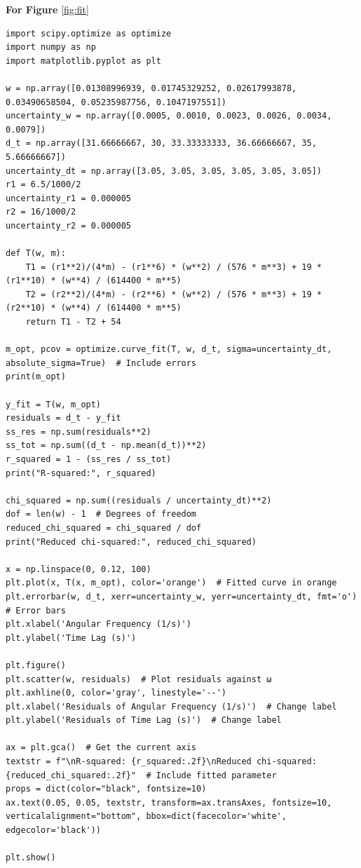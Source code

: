 \documentclass[12pt]{article}
\begin{document}
\newpage
\textbf{For Figure }\ref{fig:fit}
\begin{lstlisting}
import scipy.optimize as optimize
import numpy as np
import matplotlib.pyplot as plt

w = np.array([0.01308996939, 0.01745329252, 0.02617993878, 0.03490658504, 0.05235987756, 0.1047197551])
uncertainty_w = np.array([0.0005, 0.0010, 0.0023, 0.0026, 0.0034, 0.0079])
d_t = np.array([31.66666667, 30, 33.33333333, 36.66666667, 35, 5.66666667])
uncertainty_dt = np.array([3.05, 3.05, 3.05, 3.05, 3.05, 3.05])
r1 = 6.5/1000/2
uncertainty_r1 = 0.000005
r2 = 16/1000/2
uncertainty_r2 = 0.000005

def T(w, m):
    T1 = (r1**2)/(4*m) - (r1**6) * (w**2) / (576 * m**3) + 19 * (r1**10) * (w**4) / (614400 * m**5)
    T2 = (r2**2)/(4*m) - (r2**6) * (w**2) / (576 * m**3) + 19 * (r2**10) * (w**4) / (614400 * m**5)
    return T1 - T2 + 54

m_opt, pcov = optimize.curve_fit(T, w, d_t, sigma=uncertainty_dt, absolute_sigma=True)  # Include errors
print(m_opt)

y_fit = T(w, m_opt)
residuals = d_t - y_fit
ss_res = np.sum(residuals**2)  
ss_tot = np.sum((d_t - np.mean(d_t))**2) 
r_squared = 1 - (ss_res / ss_tot)
print("R-squared:", r_squared)

chi_squared = np.sum((residuals / uncertainty_dt)**2)
dof = len(w) - 1  # Degrees of freedom
reduced_chi_squared = chi_squared / dof
print("Reduced chi-squared:", reduced_chi_squared)

x = np.linspace(0, 0.12, 100)
plt.plot(x, T(x, m_opt), color='orange')  # Fitted curve in orange
plt.errorbar(w, d_t, xerr=uncertainty_w, yerr=uncertainty_dt, fmt='o')  # Error bars
plt.xlabel('Angular Frequency (1/s)')
plt.ylabel('Time Lag (s)')

plt.figure()  
plt.scatter(w, residuals)  # Plot residuals against ω
plt.axhline(0, color='gray', linestyle='--')  
plt.xlabel('Residuals of Angular Frequency (1/s)')  # Change label
plt.ylabel('Residuals of Time Lag (s)')  # Change label

ax = plt.gca()  # Get the current axis
textstr = f"\nR-squared: {r_squared:.2f}\nReduced chi-squared: {reduced_chi_squared:.2f}"  # Include fitted parameter
props = dict(color="black", fontsize=10)
ax.text(0.05, 0.05, textstr, transform=ax.transAxes, fontsize=10, verticalalignment="bottom", bbox=dict(facecolor='white', edgecolor='black'))

plt.show()
\end{lstlisting}
\end{document}
